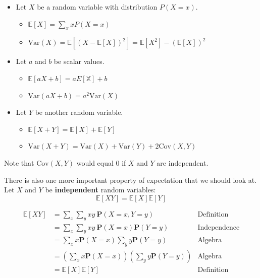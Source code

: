 \documentclass[
  letterpaper,
  DIV=11,
  numbers=noendperiod]{scrreprt}
\providecommand{\tightlist}{%
  \setlength{\itemsep}{0pt}\setlength{\parskip}{0pt}}\usepackage{longtable,booktabs,array}
\begin{document}
\begin{itemize}
\tightlist
\item
  Let \(X\) be a random variable with distribution \(P(X=x)\).

  \begin{itemize}
  \tightlist
  \item
    \(\mathbb{E}[X] = \sum_{x} x P(X=x)\)
  \item
    \(\text{Var}(X) = \mathbb{E}[(X-\mathbb{E}[X])^2] = \mathbb{E}[X^2] - (\mathbb{E}[X])^2\)
  \end{itemize}
\item
  Let \(a\) and \(b\) be scalar values.

  \begin{itemize}
  \tightlist
  \item
    \(\mathbb{E}[aX+b] = aE[\mathbb{X}] + b\)
  \item
    \(\text{Var}(aX+b) = a^2 \text{Var}(X)\)
  \end{itemize}
\item
  Let \(Y\) be another random variable.

  \begin{itemize}
  \tightlist
  \item
    \(\mathbb{E}[X+Y] = \mathbb{E}[X] + \mathbb{E}[Y]\)
  \item
    \(\text{Var}(X + Y) = \text{Var}(X) + \text{Var}(Y) + 2\text{Cov}(X,Y)\)
  \end{itemize}
\end{itemize}

Note that \(\text{Cov}(X,Y)\) would equal 0 if \(X\) and \(Y\) are
independent.

There is also one more important property of expectation that we should
look at. Let \(X\) and \(Y\) be \textbf{independent} random variables:
\[ \mathbb{E}[XY] = \mathbb{E}[X]\mathbb{E}[Y] \]

\begin{tcolorbox}[enhanced jigsaw, colback=white, arc=.35mm, toprule=.15mm, colframe=quarto-callout-tip-color-frame, coltitle=black, opacitybacktitle=0.6, breakable, titlerule=0mm, leftrule=.75mm, left=2mm, opacityback=0, bottomtitle=1mm, rightrule=.15mm, colbacktitle=quarto-callout-tip-color!10!white, bottomrule=.15mm, title=\textcolor{quarto-callout-tip-color}{\faLightbulb}\hspace{0.5em}{Proof}, toptitle=1mm]

\[\begin{align}
   \mathbb{E}[XY] &= \sum_x\sum_y xy\ \textbf{P}(X=x, Y=y) &\text{Definition} \\
   &= \sum_x\sum_y xy\ \textbf{P}(X=x)\textbf{P}(Y=y) &\text{Independence}\\
   &= \sum_x x\textbf{P}(X=x) \sum_y y \textbf{P}(Y=y) &\text{Algebra}\\
   &= \left(\sum_x x\textbf{P}(X=x)\right) \left(\sum_y y \textbf{P}(Y=y)\right) &\text{Algebra}\\
   &= \mathbb{E}[X]\mathbb{E}[Y] &\text{Definition}
\end{align}\]

\end{tcolorbox}
\end{document}
